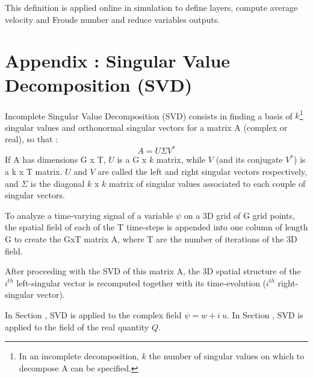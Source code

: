 This definition is applied online in simulation to define layers, compute average velocity and Froude number and reduce variables outputs.
\color{black}

\section{Appendix : Singular Value Decomposition (SVD)}
\label{annexeSVD}
Incomplete Singular Value Decomposition (SVD) consists in finding a basis of $k$\footnote{In an incomplete decomposition, $k$ the number of singular values on which to decompose A can be specified.} singular values and orthonormal singular vectors for a matrix A (complex or real), so that :
\begin{equation}
A = U \Sigma V^* 
\end{equation}
If A has dimensions G x T, $U$ is a G x $k$ matrix, while $V$ (and its conjugate $V^*$) is a k x T matrix. $U$ and $V$ are called the left and right singular vectors respectively, and $\Sigma$ is the diagonal $k$ x $k$ matrix of singular values associated to each couple of singular vectors.

To analyze a time-varying signal of a variable $\psi$ on a 3D grid of G grid points, the spatial field of each of the T time-steps is appended into one column of length G to create the GxT matrix A, where T are the number of iterations of the 3D field. 

After proceeding with the SVD of this matrix A, the 3D spatial structure of the $i^{th}$ left-singular vector is recomputed together with its time-evolution ($i^{th}$ right-singular vector).

In Section , SVD is applied to the complex field $\psi=w+i\ u$. %
In Section , SVD is applied to the field of the real quantity $Q$.
